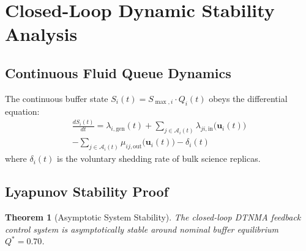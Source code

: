 \documentclass[journal,compsoc]{IEEEtran}
\newtheorem{theorem}{Theorem}
\begin{document}
\section{Closed-Loop Dynamic Stability Analysis}

\subsection{Continuous Fluid Queue Dynamics}
The continuous buffer state $S_i(t) = S_{\max, i} \cdot Q_i(t)$ obeys the differential equation:
\begin{multline}
\frac{d S_i(t)}{dt} = \lambda_{i, \mathrm{gen}}(t) + \sum_{j \in \mathcal{A}_i(t)} \lambda_{ji, \mathrm{in}}\bigl(\mathbf{u}_i(t)\bigr) \\
- \sum_{j \in \mathcal{A}_i(t)} \mu_{ij, \mathrm{out}}\bigl(\mathbf{u}_i(t)\bigr) - \delta_i(t)
\end{multline}
where $\delta_i(t)$ is the voluntary shedding rate of bulk science replicas.

\subsection{Lyapunov Stability Proof}
\begin{theorem}[Asymptotic System Stability]
\label{thm:lyapunov}
The closed-loop DTNMA feedback control system is asymptotically stable around nominal buffer equilibrium $Q^* = 0.70$.
\end{theorem}
\end{document}

